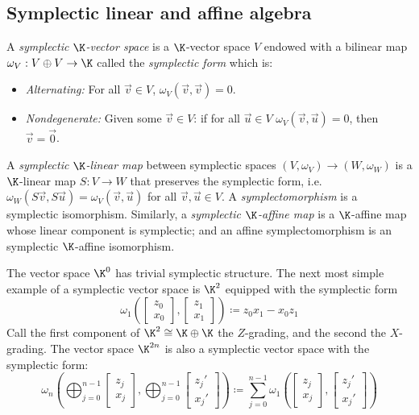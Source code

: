 \subsection{Symplectic linear and affine algebra}
\label{ssec:symplectic_linear_algebra}
\begin{definition}
  A \emph{symplectic \(\K\)-vector space} is a \(\K\)-vector space \(V\) endowed
  with a bilinear map \(\omega_V: V \oplus V \to \K\) called the  \emph{symplectic form} which is:
  \begin{itemize}
    \item \emph{Alternating:} For all \(\vec v \in V\), \(\omega_V(\vec v,\vec v)=0\).
    \item \emph{Nondegenerate:} Given some \(\vec v \in V\): if for all \(\vec u\in V\) \(\omega_V(\vec v,\vec u)=0\), then \(\vec v=\vec 0\).
  \end{itemize}
  A \emph{symplectic \(\K\)-linear map}
  between symplectic spaces \((V,\omega_V) \to (W, \omega_W)\) is a \(\K\)-linear
  map \(S : V \to W\) that preserves the symplectic form, i.e. \(\omega_W(S\vec v,S\vec u)
  = \omega_V(\vec v,\vec u)\) for all \(\vec v, \vec u\in V\). A
  \emph{symplectomorphism} is a symplectic isomorphism.
  Similarly, a \emph{symplectic \(\K\)-affine map} is a \(\K\)-affine map whose linear component is symplectic; and an affine symplectomorphism is an  symplectic \(\K\)-affine isomorphism.
\end{definition}
The vector space \(\K^0\) has trivial symplectic structure.
The next most simple example of a symplectic vector space is
\(\K^2\) equipped with the symplectic form 
\[
\omega_{1}\!\left(\begin{bmatrix}z_0\\ x_0\end{bmatrix}, \begin{bmatrix}z_1\\ x_1\end{bmatrix}\right)
  \coloneqq  z_0x_1-x_0z_1
\]
Call the first component of \(\K^2\cong \K\oplus\K\) the \(Z\)-grading, and the second the \(X\)-grading.
The vector space \(\K^{2n}\) is also a symplectic vector space with the symplectic form:
\[\omega_n\!\left( \bigoplus_{j=0}^{n-1} \begin{bmatrix}z_j\\x_j\end{bmatrix}, \bigoplus_{j=0}^{n-1} \begin{bmatrix}z_j'\\x_j'\end{bmatrix} \right) \coloneqq  \sum_{j=0}^{n-1} \omega_1\!\left(\begin{bmatrix}z_j\\x_j\end{bmatrix} ,\begin{bmatrix}z_j'\\x_j'\end{bmatrix} \right)\]
